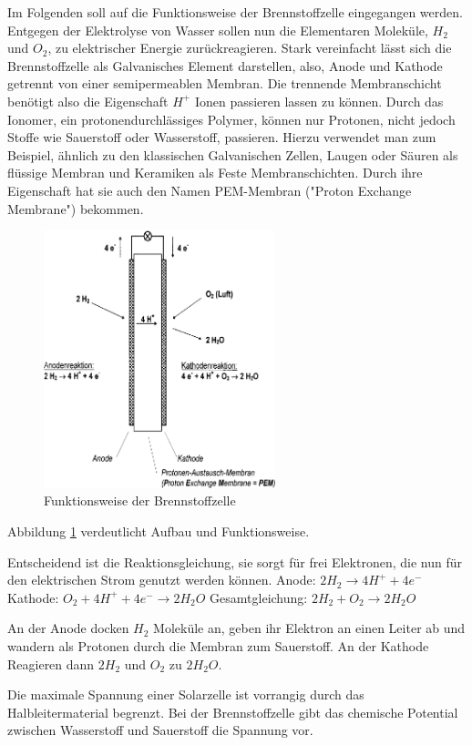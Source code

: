 Im Folgenden soll auf die Funktionsweise der Brennstoffzelle eingegangen werden. 
Entgegen der Elektrolyse von Wasser sollen nun die Elementaren Moleküle, $H_2$ und $O_2$, zu elektrischer Energie zurückreagieren.
Stark vereinfacht lässt sich die Brennstoffzelle als Galvanisches Element darstellen, also, Anode und Kathode getrennt von einer semipermeablen Membran.
Die trennende Membranschicht benötigt also die Eigenschaft $H^+$ Ionen passieren lassen zu können.
Durch das Ionomer, ein protonendurchlässiges Polymer, können nur Protonen, nicht jedoch Stoffe wie Sauerstoff oder Wasserstoff, passieren.
Hierzu verwendet man zum Beispiel, ähnlich zu den klassischen Galvanischen Zellen, Laugen oder Säuren als flüssige Membran und Keramiken als Feste Membranschichten.
Durch ihre Eigenschaft hat sie auch den Namen PEM-Membran ("Proton Exchange Membrane") bekommen.
\begin{figure}
	\centering
	\includegraphics[width=0.6\textwidth]{Abb/brennstoffzelle.png}
	\caption{Funktionsweise der Brennstoffzelle}
	\label{zelle}
\end{figure}
Abbildung \ref{zelle} verdeutlicht Aufbau und Funktionsweise.

Entscheidend ist die Reaktionsgleichung, sie sorgt für frei Elektronen, die nun für den elektrischen Strom genutzt werden können.
Anode:
$2 H_2 \rightarrow 4 H^+ + 4e^-$
Kathode:
$O_2 + 4 H^+ + 4 e^- \rightarrow 2 H_2O$
Gesamtgleichung:
$2 H_2 + O_2 \rightarrow 2 H_2O$

An der Anode docken $H_2$ Moleküle an, geben ihr Elektron an einen Leiter ab und wandern als Protonen durch die Membran zum Sauerstoff.
An der Kathode Reagieren dann $2 H_2$ und $O_2$ zu $2 H_2O$.


Die maximale Spannung einer Solarzelle ist vorrangig durch das Halbleitermaterial begrenzt. Bei der Brennstoffzelle gibt das chemische Potential zwischen Wasserstoff und Sauerstoff die Spannung vor.
